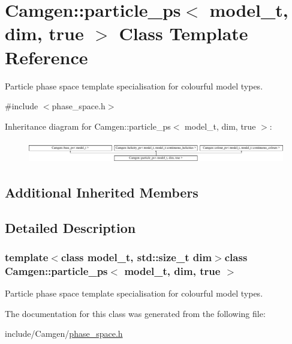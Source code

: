 \hypertarget{a00404}{\section{Camgen\-:\-:particle\-\_\-ps$<$ model\-\_\-t, dim, true $>$ Class Template Reference}
\label{a00404}
}


Particle phase space template specialisation for colourful model types.  




{\ttfamily \#include $<$phase\-\_\-space.\-h$>$}

Inheritance diagram for Camgen\-:\-:particle\-\_\-ps$<$ model\-\_\-t, dim, true $>$\-:\begin{figure}[H]
\begin{center}
\leavevmode
\includegraphics[height=0.998218cm]{a00404}
\end{center}
\end{figure}
\subsection*{Additional Inherited Members}


\subsection{Detailed Description}
\subsubsection*{template$<$class model\-\_\-t, std\-::size\-\_\-t dim$>$class Camgen\-::particle\-\_\-ps$<$ model\-\_\-t, dim, true $>$}

Particle phase space template specialisation for colourful model types. 

The documentation for this class was generated from the following file\-:\begin{DoxyCompactItemize}
\item 
include/\-Camgen/\hyperlink{a00694}{phase\-\_\-space.\-h}\end{DoxyCompactItemize}
